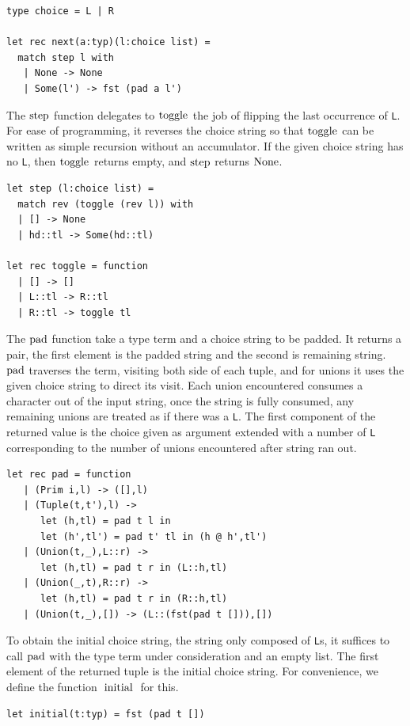 \documentclass[a4paper,english]{lipics-v2019}
\renewcommand{\L}{{\tt L}\xspace}
\newcommand{\Ls}{{\tt L}s\xspace}
\renewcommand{\c}[1]{\ensuremath{\text{\lstinline{#1}}}\xspace}
\begin{document}
\begin{lstlisting}
type choice = L | R

let rec next(a:typ)(l:choice list) = 
  match step l with
   | None -> None
   | Some(l') -> fst (pad a l')
\end{lstlisting}

The \c{step} function delegates to \c{toggle} the job of flipping the last
occurrence of \L. For ease of programming, it reverses the choice string so
that \c{toggle} can be written as simple recursion without an accumulator.
If the given choice string has no \L, then \c{toggle} returns empty, and
\c{step} returns \c{None}.

\begin{lstlisting}
let step (l:choice list) =
  match rev (toggle (rev l)) with
  | [] -> None
  | hd::tl -> Some(hd::tl)

let rec toggle = function
  | [] -> []    
  | L::tl -> R::tl
  | R::tl -> toggle tl
\end{lstlisting}

The \c{pad} function take a type term and a choice string to be padded. It
returns a pair, the first element is the padded string and the second is
remaining string. \c{pad} traverses the term, visiting both side of each
tuple, and for unions it uses the given choice string to direct its visit.
Each union encountered consumes a character out of the input string, once
the string is fully consumed, any remaining unions are treated as if there
was a \L. The first component of the returned value is the choice given as
argument extended with a number of \L corresponding to the number of unions
encountered after string ran out.

\begin{lstlisting}
let rec pad = function
   | (Prim i,l) -> ([],l)
   | (Tuple(t,t'),l) -> 
      let (h,tl) = pad t l in
      let (h',tl') = pad t' tl in (h @ h',tl')
   | (Union(t,_),L::r) -> 
      let (h,tl) = pad t r in (L::h,tl)
   | (Union(_,t),R::r) -> 
      let (h,tl) = pad t r in (R::h,tl)
   | (Union(t,_),[]) -> (L::(fst(pad t [])),[])
\end{lstlisting}

To obtain the initial choice string, the string only composed of \Ls, it
suffices to call \c{pad} with the type term under consideration and an empty
list. The first element of the returned tuple is the initial choice
string. For convenience, we define the function \c{initial} for this.

\begin{lstlisting}
let initial(t:typ) = fst (pad t [])
\end{lstlisting}
\end{document}
